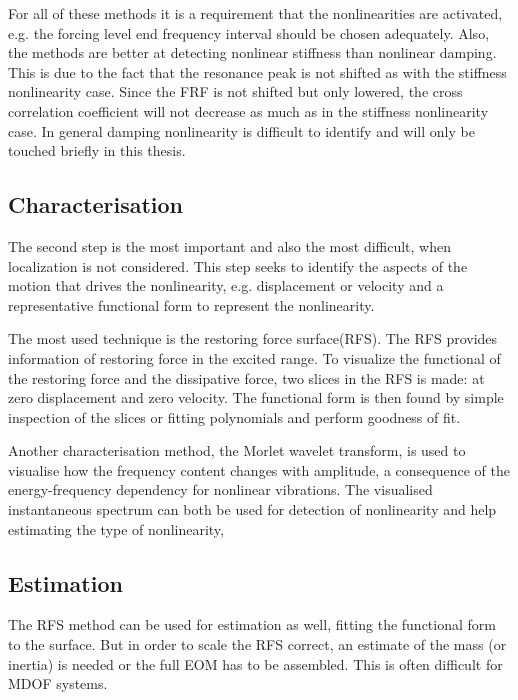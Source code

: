 For all of these methods it is a requirement that the nonlinearities are
activated, e.g. the forcing level end frequency interval should be chosen
adequately. Also, the methods are better at detecting nonlinear stiffness than
nonlinear damping. This is due to the fact that the resonance peak is not
shifted as with the stiffness nonlinearity case. Since the FRF is not shifted
but only lowered, the cross correlation coefficient will not decrease as much as
in the stiffness nonlinearity case. In general damping nonlinearity is difficult
to identify and will only be touched briefly in this thesis.

\subsection{Characterisation}
\label{sec:characterization}

The second step is the most important and also the most difficult, when
localization is not considered.
This step seeks to identify the aspects of the motion that drives the
nonlinearity, e.g. displacement or velocity and a representative functional form
to represent the nonlinearity.


The most used technique is the restoring force surface(RFS). The RFS
provides information of restoring force in the excited range. To visualize the
functional of the restoring force and the dissipative force, two slices in the
RFS is made: at zero displacement and zero velocity. The functional form is then
found by simple inspection of the slices or fitting polynomials and perform
goodness of fit.

Another characterisation method, the Morlet wavelet transform, is used to
visualise how the frequency content changes with amplitude, a consequence of the
energy-frequency dependency for nonlinear vibrations. The visualised
instantaneous spectrum can both be used for detection of nonlinearity and help
estimating the type of nonlinearity,



\subsection{Estimation}
\label{sec:estimation}

The RFS method can be used for estimation as well, fitting the functional form
to the surface. But in order to scale the RFS correct, an estimate of the mass
(or inertia) is needed or the full EOM has to be assembled. This is often
difficult for MDOF systems.

